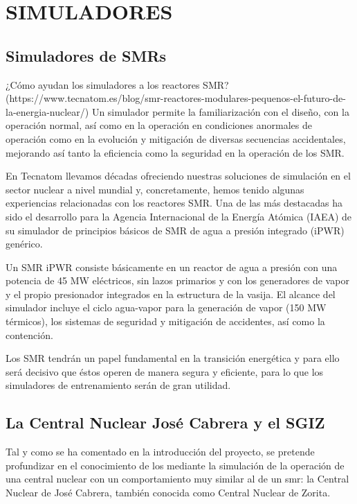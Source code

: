 \newpage
\section{SIMULADORES} \label{simuladores}

\subsection{Simuladores de SMRs}

¿Cómo ayudan los simuladores a los reactores SMR?\newline
(https://www.tecnatom.es/blog/smr-reactores-modulares-pequenos-el-futuro-de-la-energia-nuclear/)
Un simulador permite la familiarización con el diseño, con la operación normal, así como en la operación en condiciones anormales de operación como en la evolución y mitigación de diversas secuencias accidentales, mejorando así tanto la eficiencia como la seguridad en la operación de los SMR.

En Tecnatom llevamos décadas ofreciendo nuestras soluciones de simulación en el sector nuclear a nivel mundial y, concretamente, hemos tenido algunas experiencias relacionadas con los reactores SMR. Una de las más destacadas ha sido el desarrollo para la Agencia Internacional de la Energía Atómica (IAEA) de su simulador de principios básicos de SMR de agua a presión integrado (iPWR) genérico.

Un SMR iPWR consiste básicamente en un reactor de agua a presión con una potencia de 45 MW eléctricos, sin lazos primarios y con los generadores de vapor y el propio presionador integrados en la estructura de la vasija. El alcance del simulador incluye el ciclo agua-vapor para la generación de vapor (150 MW térmicos), los sistemas de seguridad y mitigación de accidentes, así como la contención.

Los SMR tendrán un papel fundamental en la transición energética y para ello será decisivo que éstos operen de manera segura y eficiente, para lo que los simuladores de entrenamiento serán de gran utilidad.

\subsection{La Central Nuclear José Cabrera y el SGIZ}

Tal y como se ha comentado en la introducción del proyecto, se pretende profundizar en el conocimiento de los \emph{} mediante la simulación de la operación de una central nuclear con un comportamiento muy similar al de un \acrshort{smr}: la Central Nuclear de José Cabrera, también conocida como Central Nuclear de Zorita.

